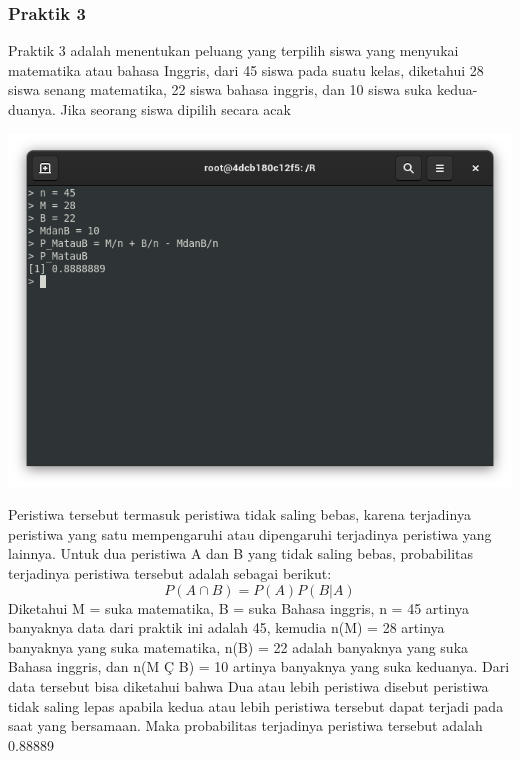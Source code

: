 \documentclass[a4paper,12pt]{article}
\begin{document}
\subsubsection{Praktik 3}
Praktik 3 adalah menentukan peluang yang terpilih siswa yang menyukai matematika atau bahasa Inggris, dari 45 siswa pada suatu kelas, diketahui 28 siswa senang matematika, 22 siswa bahasa inggris, dan 10 siswa suka kedua-duanya. Jika seorang siswa dipilih secara acak
\begin{center}
	\includegraphics[scale=.5]{prak3}
\end{center}
Peristiwa tersebut termasuk peristiwa tidak saling bebas, karena terjadinya peristiwa yang satu mempengaruhi atau dipengaruhi terjadinya peristiwa yang lainnya. Untuk dua peristiwa A dan B yang tidak saling bebas, probabilitas terjadinya peristiwa tersebut adalah sebagai berikut:
\[ P(A \cap B) = P(A) P(B|A) \]
Diketahui M = suka matematika, B = suka Bahasa inggris, n = 45 artinya banyaknya data dari praktik ini adalah 45, kemudia n(M) = 28 artinya banyaknya yang suka matematika, n(B) = 22 adalah banyaknya yang suka Bahasa inggris, dan n(M Ç B) = 10 artinya banyaknya yang suka keduanya. Dari data tersebut bisa diketahui bahwa Dua atau lebih peristiwa disebut peristiwa tidak saling lepas apabila kedua atau lebih peristiwa tersebut dapat terjadi pada saat yang bersamaan. Maka probabilitas terjadinya peristiwa tersebut adalah 0.88889
\end{document}
